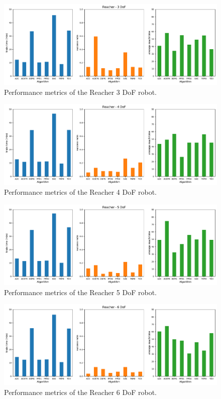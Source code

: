 \documentclass{article}
\begin{document}
\begin{figure}[H]
    \centering
    \includegraphics[width=\textwidth]{../Reacher3Dof-v0/reacher3.pdf}
\caption{Performance metrics of the Reacher 3 DoF robot.}
\end{figure}

\begin{figure}[H]
    \centering
    \includegraphics[width=\textwidth]{../Reacher4Dof-v0/reacher4.pdf}
\caption{Performance metrics of the Reacher 4 DoF robot.}
\end{figure}

\begin{figure}[H]
    \centering
    \includegraphics[width=\textwidth]{../Reacher5Dof-v0/reacher5.pdf}
\caption{Performance metrics of the Reacher 5 DoF robot.}
\end{figure}

\begin{figure}[H]
    \centering
    \includegraphics[width=\textwidth]{../Reacher6Dof-v0/reacher6.pdf}
\caption{Performance metrics of the Reacher 6 DoF robot.}
\end{figure}
\end{document}
